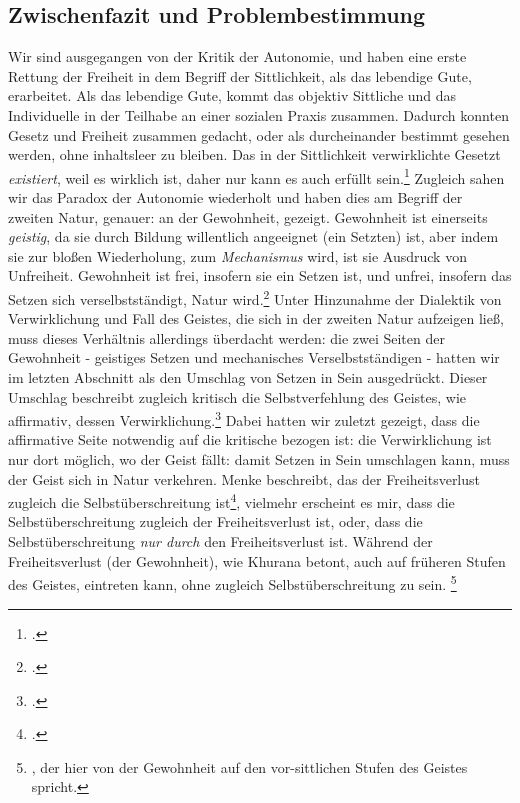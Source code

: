 \documentclass[12pt, a4paper, openany]{report}
\begin{document}
\subsection{Zwischenfazit und Problembestimmung}\label{zwisschenfazit}
Wir sind ausgegangen von der Kritik der Autonomie, und haben eine erste Rettung der Freiheit in dem Begriff der Sittlichkeit, als das lebendige Gute, erarbeitet. 
Als das lebendige Gute, kommt das objektiv Sittliche und das Individuelle in der Teilhabe an einer sozialen Praxis zusammen. 
Dadurch konnten Gesetz und Freiheit zusammen gedacht, oder als durcheinander bestimmt gesehen werden, ohne inhaltsleer zu bleiben.
Das in der Sittlichkeit verwirklichte Gesetzt \emph{existiert}, weil es wirklich ist, daher nur kann es auch erfüllt sein.\footcite[Vgl.][57]{menke_autonomie_2018}
Zugleich sahen wir das Paradox der Autonomie wiederholt und haben dies am Begriff der zweiten Natur, genauer: an der Gewohnheit, gezeigt.
Gewohnheit ist einerseits \emph{geistig}, da sie durch Bildung willentlich angeeignet (ein Setzten) ist, aber indem sie zur bloßen Wiederholung, zum \emph{Mechanismus} wird, ist sie  Ausdruck von Unfreiheit.
Gewohnheit ist frei, insofern sie ein Setzen ist, und unfrei, insofern das Setzen sich verselbstständigt, Natur wird.\footcite[Vgl.][145]{menke_autonomie_2018}
Unter Hinzunahme der Dialektik von Verwirklichung und Fall des Geistes, die sich in der zweiten Natur aufzeigen ließ, muss dieses Verhältnis allerdings überdacht werden:
die zwei Seiten der Gewohnheit - geistiges Setzen und mechanisches Verselbstständigen - hatten wir im letzten Abschnitt als den Umschlag von Setzen in Sein ausgedrückt. 
Dieser Umschlag beschreibt zugleich kritisch die Selbstverfehlung des Geistes, wie affirmativ, dessen Verwirklichung.\footcite[Vgl.][145]{menke_autonomie_2018}
Dabei hatten wir zuletzt gezeigt, dass die affirmative Seite notwendig auf die kritische bezogen ist: 
die Verwirklichung ist nur dort möglich, wo der Geist fällt: 
damit Setzen in Sein umschlagen kann, muss der Geist sich in Natur verkehren. 
Menke beschreibt, das der Freiheitsverlust zugleich die Selbstüberschreitung ist\footcite[Vgl.][145]{menke_autonomie_2018}, vielmehr erscheint es mir, dass die Selbstüberschreitung zugleich der Freiheitsverlust ist, oder, dass die Selbstüberschreitung \emph{nur durch} den Freiheitsverlust ist. 
Während der Freiheitsverlust (der Gewohnheit), wie Khurana betont, auch auf früheren Stufen des Geistes, eintreten kann, ohne zugleich Selbstüberschreitung zu sein.%
\footnote{
    \cite[Vgl. z.B.][§88, S. 433]{khurana_freiheit_2017}, der hier von der Gewohnheit auf den vor-sittlichen Stufen des Geistes spricht.
}
\end{document}
